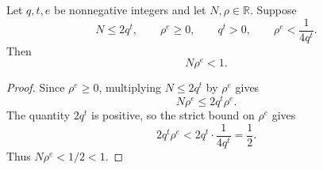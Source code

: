 \begin{helper}
Let \(q,t,e\) be nonnegative integers and let \(N,\rho\in\mathbb R\).  Suppose
\[
  N\le 2q^t,\qquad \rho^e\ge0,\qquad q^t>0,\qquad
  \rho^e<\frac{1}{4q^t}.
\]
Then
\[
  N\rho^e<1.
\]
\end{helper}
\begin{proof}
Since \(\rho^e\ge0\), multiplying \(N\le2q^t\) by \(\rho^e\) gives
\[
  N\rho^e\le 2q^t\rho^e.
\]
The quantity \(2q^t\) is positive, so the strict bound on \(\rho^e\) gives
\[
  2q^t\rho^e
  <2q^t\cdot\frac{1}{4q^t}
  =\frac12.
\]
Thus \(N\rho^e<1/2<1\).
\end{proof}
